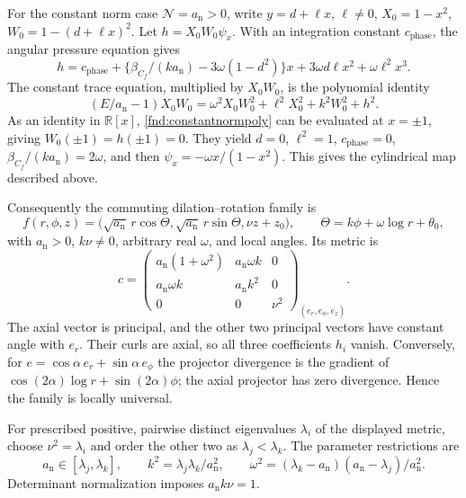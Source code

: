 \documentclass[11pt,a4paper]{article}
\numberwithin{equation}{section}
\theoremstyle{plain}
\theoremstyle{definition}
\theoremstyle{remark}
\begin{document}
For the constant norm case $\mathcal N=a_{\mathrm n}>0$, write $y=d+\ell x$, $\ell\ne0$, $X_0=1-x^2$, $W_0=1-(d+\ell x)^2$. Let $h=X_0W_0\psi_x$. With an integration constant $c_{\mathrm{phase}}$, the angular pressure equation gives
\[
h=c_{\mathrm{phase}}+\{\beta_{C_f}/(ka_{\mathrm n})-3\omega(1-d^2)\}x
+3\omega d\ell x^2+\omega\ell^2x^3.
\]
The constant trace equation, multiplied by $X_0W_0$, is the polynomial identity
\begin{equation}\label{fnd:constantnormpoly}
(E/a_{\mathrm n}-1)X_0W_0=\omega^2X_0W_0^2+\ell^2X_0^2+k^2W_0^2+h^2.
\end{equation}
As an identity in $\mathbb R[x]$, \eqref{fnd:constantnormpoly} can be evaluated at $x=\pm1$, giving $W_0(\pm1)=h(\pm1)=0$. They yield $d=0$, $\ell^2=1$, $c_{\mathrm{phase}}=0$, $\beta_{C_f}/(ka_{\mathrm n})=2\omega$, and then $\psi_x=-\omega x/(1-x^2)$. This gives the cylindrical map described above.

Consequently the commuting dilation--rotation family is
\begin{equation}\label{fnd:logcylinder}
f(r,\phi,z)=\bigl(\sqrt{a_{\mathrm n}}\,r\cos\Theta,
\sqrt{a_{\mathrm n}}\,r\sin\Theta,\nu z+z_0\bigr),\qquad
\Theta=k\phi+\omega\log r+\theta_0,
\end{equation}
with $a_{\mathrm n}>0$, $k\nu\ne0$, arbitrary real $\omega$, and local angles. Its metric is
\[
c=\begin{pmatrix}
a_{\mathrm n}(1+\omega^2)&a_{\mathrm n}\omega k&0\\
a_{\mathrm n}\omega k&a_{\mathrm n}k^2&0\\
0&0&\nu^2
\end{pmatrix}_{(e_r,e_\phi,e_z)}.
\]
The axial vector is principal, and the other two principal vectors have constant angle with $e_r$. Their curls are axial, so all three coefficients $h_i$ vanish. Conversely, for $e=\cos\alpha\,e_r+\sin\alpha\,e_\phi$ the projector divergence is the gradient of $\cos(2\alpha)\log r+\sin(2\alpha)\phi$; the axial projector has zero divergence. Hence the family is locally universal.

For prescribed positive, pairwise distinct eigenvalues $\lambda_i$ of the displayed
metric, choose $\nu^2=\lambda_i$ and order the other two as
$\lambda_j<\lambda_k$. The parameter restrictions are
\[
a_{\mathrm n}\in[\lambda_j,\lambda_k],\qquad
k^2=\lambda_j\lambda_k/a_{\mathrm n}^2,\qquad
\omega^2=(\lambda_k-a_{\mathrm n})(a_{\mathrm n}-\lambda_j)/a_{\mathrm n}^2.
\]
Determinant normalization imposes $a_{\mathrm n}k\nu=1$.
\end{document}

